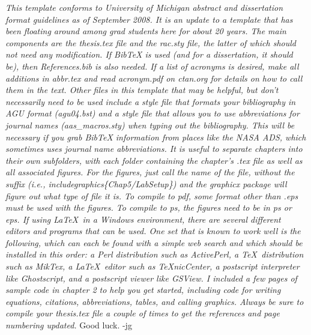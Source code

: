 \textit{This template conforms to University of Michigan abstract and dissertation format guidelines as of September 2008. It is an update to a template that has been floating around among grad students here for about 20 years. The main components are the thesis.tex file and the rac.sty file, the latter of which should not need any modification. If BibTeX is used (and for a dissertation, it should be), then References.bib is also needed. If a list of acronyms is desired, make all additions in abbr.tex and read acronym.pdf on ctan.org for details on how to call them in the text. Other files in this template that may be helpful, but don't necessarily need to be used include a style file that formats your bibliography in AGU format (agu04.bst) and a style file that allows you to use abbreviations for journal names (aas\_macros.sty) when typing out the bibliography. This will be necessary if you grab BibTeX information from places like the NASA ADS, which sometimes uses journal name abbreviations. It is useful to separate chapters into their own subfolders, with each folder containing the chapter's .tex file as well as all associated figures. For the figures, just call the name of the file, without the suffix (i.e., includegraphics\{Chap5/LabSetup\}) and the graphicx package will figure out what type of file it is. To compile to pdf, some format other than .eps must be used with the figures. To compile to ps, the figures need to be in ps or eps. If using \LaTeX\, in a Windows environment, there are several different editors and programs that can be used. One set that is known to work well is the following, which can each be found with a simple web search and which should be installed in this order: a Perl distribution such as ActivePerl, a \TeX\, distribution such as MikTex, a \LaTeX\, editor such as TeXnicCenter, a postscript interpreter like Ghostscript, and a postscript viewer like GSView. I included a few pages of sample code in chapter 2 to help you get started, including code for writing equations, citations, abbreviations, tables, and calling graphics. Always be sure to compile your thesis.tex file a couple of times to get the references and page numbering updated.} Good luck. -jg
